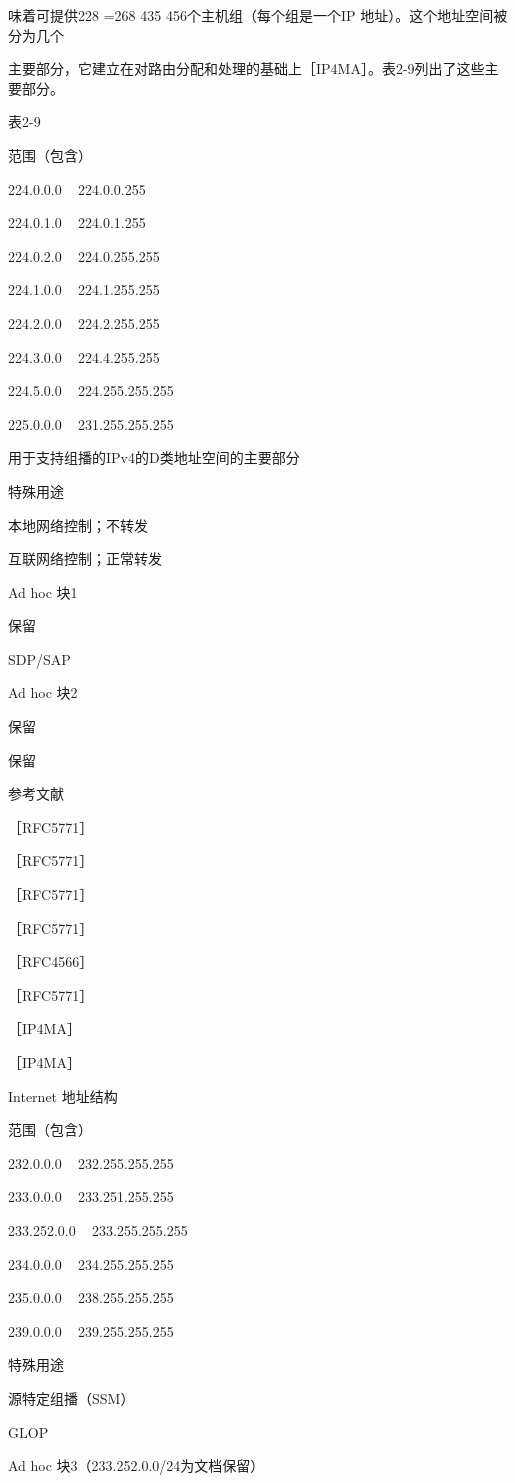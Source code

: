 味着可提供228 =268 435 456个主机组（每个组是一个IP 地址）。这个地址空间被分为几个

主要部分，它建立在对路由分配和处理的基础上［IP4MA］。表2-9列出了这些主要部分。

表2-9

范围（包含）

224.0.0.0 ~ 224.0.0.255

224.0.1.0 ~ 224.0.1.255

224.0.2.0 ~ 224.0.255.255

224.1.0.0 ~ 224.1.255.255

224.2.0.0 ~ 224.2.255.255

224.3.0.0 ~ 224.4.255.255

224.5.0.0 ~ 224.255.255.255

225.0.0.0 ~ 231.255.255.255

用于支持组播的IPv4的D类地址空间的主要部分

特殊用途

本地网络控制；不转发

互联网络控制；正常转发

Ad hoc 块1

保留

SDP/SAP

Ad hoc 块2

保留

保留

参考文献

［RFC5771］

［RFC5771］

［RFC5771］

［RFC5771］

［RFC4566］

［RFC5771］

［IP4MA］

［IP4MA］

Internet 地址结构

范围（包含）

232.0.0.0 ~ 232.255.255.255

233.0.0.0 ~ 233.251.255.255

233.252.0.0 ~ 233.255.255.255

234.0.0.0 ~ 234.255.255.255

235.0.0.0 ~ 238.255.255.255

239.0.0.0 ~ 239.255.255.255

特殊用途

源特定组播（SSM）

GLOP

Ad hoc 块3（233.252.0.0/24为文档保留）

